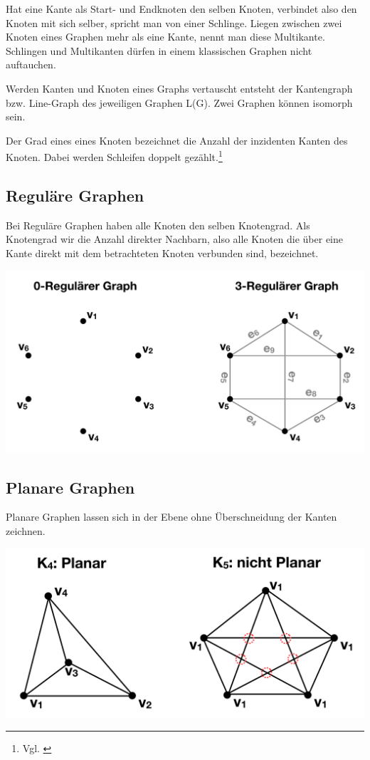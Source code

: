 Hat eine Kante als Start- und Endknoten den selben Knoten, verbindet also den Knoten mit sich selber, spricht man von einer Schlinge.
Liegen zwischen zwei Knoten eines Graphen mehr als eine Kante, nennt man diese Multikante.
Schlingen und Multikanten dürfen in einem klassischen Graphen nicht auftauchen.\cite{}

Werden Kanten und Knoten eines Graphs vertauscht entsteht der Kantengraph bzw. Line-Graph des jeweiligen Graphen L(G).
Zwei Graphen können isomorph sein.

Der Grad eines eines Knoten bezeichnet die Anzahl der inzidenten Kanten des Knoten. Dabei werden Schleifen doppelt gezählt.\footnote{Vgl. \cite[Seite 13]{rahm2017}}

\subsection{Reguläre Graphen}
Bei Reguläre Graphen haben alle Knoten den selben Knotengrad.
Als Knotengrad wir die Anzahl direkter Nachbarn, also alle Knoten die über eine Kante direkt mit dem betrachteten Knoten verbunden sind, bezeichnet.\cite{felsner2012geometric}
\begin{center}
	\includegraphics[scale = 0.5]{./images/Regulaerer_graph.png}
\end{center}
\subsection{Planare Graphen}
Planare Graphen lassen sich in der Ebene ohne Überschneidung der Kanten zeichnen.\cite{Theobald2016}
\begin{center}
	\includegraphics[scale = 0.5]{./images/planarer_graph.png}
\end{center}
